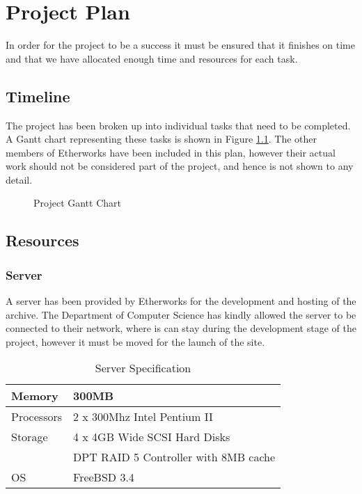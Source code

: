 
\chapter{Project Plan}
In order for the project to be a success it must be ensured that it finishes on time and that we have allocated enough time and resources for each task.

\section{Timeline}
The project has been broken up into individual tasks that need to be completed.  A Gantt chart representing these tasks is shown in Figure \ref{gantt}.  The other members of Etherworks have been included in this plan, however their actual work should not be considered part of the project, and hence is not shown to any detail.


\begin{figure}[!ht]
\begin{center}
\end{center}
\label{gantt}
\caption{Project Gantt Chart}
\end{figure}



\section{Resources}

\subsection{Server}\label{serverspecs}
A server has been provided by Etherworks for the development and hosting of the archive.  The Department of Computer Science has kindly allowed the server to be connected to their network, where is can stay during the development stage of the project, however it must be moved for the launch of the site.


\begin{table}[!ht]
\begin{center}
\begin{tabular}{|l|l|}
\hline
Memory          & 300MB \\
\hline
Processors      & 2 x 300Mhz Intel Pentium II \\
\hline
Storage         & 4 x 4GB Wide SCSI Hard Disks \\
                & DPT RAID 5 Controller with 8MB cache \\
\hline
OS              & FreeBSD 3.4 \\
\hline
\end{tabular}
\caption{Server Specification}
\end{center}
\end{table}

